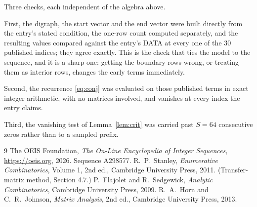 \documentclass[11pt,a4paper]{article}
\theoremstyle{plain}
\theoremstyle{definition}
\begin{document}
Three checks, each independent of the algebra above.

First, the digraph, the start vector and the end vector were built directly from the
entry's stated condition, the one-row count computed separately, and the resulting values
compared against the entry's DATA at every one of the $30$ published indices; they
agree exactly. This is the check that ties the model to the sequence, and it is a sharp one:
getting the boundary rows wrong, or treating them as interior rows, changes the early terms
immediately.

Second, the recurrence \eqref{eq:conj} was evaluated on those published terms in exact
integer arithmetic, with no matrices involved, and vanishes at every index the entry claims.

Third, the vanishing test of Lemma~\ref{lem:crit} was carried past $S=64$ consecutive
zeros rather than to a sampled prefix.

\begin{thebibliography}{9}
 The OEIS Foundation, \emph{The On-Line Encyclopedia of Integer
Sequences}, \url{https://oeis.org}, 2026. Sequence A298577.
 R.~P.~Stanley, \emph{Enumerative Combinatorics}, Volume 1, 2nd ed.,
Cambridge University Press, 2011. (Transfer-matrix method, Section 4.7.)
 P.~Flajolet and R.~Sedgewick, \emph{Analytic Combinatorics}, Cambridge
University Press, 2009.
 R.~A.~Horn and C.~R.~Johnson, \emph{Matrix Analysis}, 2nd ed., Cambridge
University Press, 2013.
\end{thebibliography}
\end{document}
